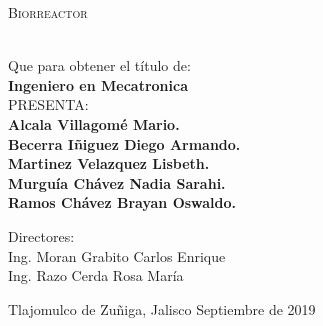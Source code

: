 \documentclass[letter,operight,12pt,spanish]{report}
\begin{document}
%
%
%
%
%
%
%
%
%
%
%
%
%
%
%
\begin{minipage}[l][0.78\textheight][t]{0.1\textwidth}
    \begin{center}
    \hskip0pt
    \vrule width2.5pt height17cm    %
        \hskip1mm
        \vrule width1pt height17cm  %
        \end{center}
\end{minipage}
\begin{minipage}[c][0.78\textheight][t]{0.8\textwidth}
      \begin{center}
      \vspace{2cm}
        {\Large \scshape {Biorreactor}}

        \vspace{2cm}

          \\[20pt]
        Que para obtener el t\'itulo de:\\[5pt]
        {\Large \textbf{{Ingeniero en Mecatronica}}}\\[40pt]
        PRESENTA:\\[12pt]
        \textbf{ \Large {Alcala Villagom\'e Mario.\\
        				Becerra I\~niguez Diego Armando.\\
        				Martinez Velazquez Lisbeth.\\
        				Murgu\'ia Ch\'avez Nadia Sarahi.\\
        				Ramos Ch\'avez Brayan Oswaldo.}}

        \vspace{2cm}

        { \small Directores}:\\ {Ing. Moran Grabito Carlos Enrique}\\{Ing. Razo Cerda Rosa Mar\'ia}
        \vspace{2.5cm}

        { Tlajomulco de Zuñiga, Jalisco} \hskip2.5cm {Septiembre de 2019}
      \end{center}
\end{minipage}
\end{document}
